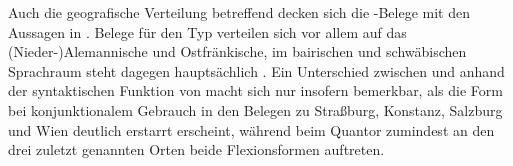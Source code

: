 Auch die geografische Verteilung betreffend decken sich die
\CAO{}-Belege mit den Aussagen in \citet[627--628]{ksw2}. Belege für
den Typ  verteilen sich vor allem auf das
\mbox{(Nieder-)}\allowbreak{}Alemannische und Ostfränkische, im bairischen und
schwäbischen Sprachraum steht dagegen hauptsächlich . Ein
Unterschied zwischen  und  anhand der syntaktischen Funktion
von  macht sich nur insofern bemerkbar, als die Form bei
konjunktionalem Gebrauch in den Belegen zu Straßburg, Konstanz, Salzburg und
Wien deutlich erstarrt erscheint, während beim Quantor zumindest an den drei
zuletzt genannten Orten beide Flexionsformen auftreten.
